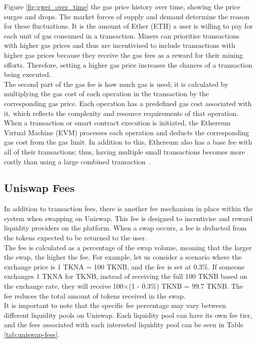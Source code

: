 \noindent Figure \ref{fig:gwei_over_time} the gas price history over time, showing the price surges and drops. The market forces of supply and demand determine the reason for these fluctuations. It is the amount of Ether (ETH) a user is willing to pay for each unit of gas consumed in a transaction. Miners can prioritise transactions with higher gas prices and thus are incentivised to include transactions with higher gas prices because they receive the gas fees as a reward for their mining efforts. Therefore, setting a higher gas price increases the chances of a transaction being executed.
\\[3mm]
The second part of the gas fee is how much gas is used; it is calculated by multiplying the gas cost of each operation in the transaction by the corresponding gas price. Each operation has a predefined gas cost associated with it, which reflects the complexity and resource requirements of that operation. When a transaction or smart contract execution is initiated, the Ethereum Virtual Machine (EVM) processes each operation and deducts the corresponding gas cost from the gas limit. In addition to this, Ethereum also has a base fee with all of their transactions; thus, having multiple small transactions becomes more costly than using a large combined transaction~\cite{noauthor_gas_nodate}.

\subsection{Uniswap Fees}
In addition to transaction fees, there is another fee mechanism in place within the system when swapping on Uniswap. This fee is designed to incentivise and reward liquidity providers on the platform. When a swap occurs, a fee is deducted from the tokens expected to be returned to the user.
\\[3mm]
The fee is calculated as a percentage of the swap volume, meaning that the larger the swap, the higher the fee. For example, let us consider a scenario where the exchange price is 1 TKNA = 100 TKNB, and the fee is set at 0.3\%. If someone exchanges 1 TKNA for TKNB, instead of receiving the full 100 TKNB based on the exchange rate, they will receive 100$\times$(1 - 0.3\%) TKNB = 99.7 TKNB. The fee reduces the total amount of tokens received in the swap.
\\[3mm]
It is important to note that the specific fee percentage may vary between different liquidity pools on Uniswap. Each liquidity pool can have its own fee tier, and the fees associated with each interested liquidity pool can be seen in Table \ref{tab:uniswap-fees}.

